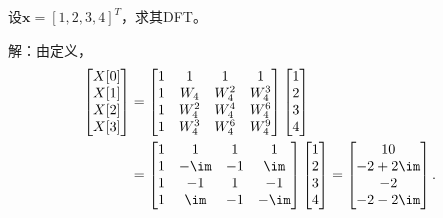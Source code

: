 \begin{example}
    设$\mathbf{x}=[1,2,3,4]^T$，求其DFT。

    解：由定义，
    \begin{align}
        \begin{bmatrix}
            X[0] \\
            X[1] \\
            X[2] \\
            X[3]
        \end{bmatrix}&=\begin{bmatrix}
            1 & 1     & 1     & 1     \\
            1 & W_4   & W_4^2 & W_4^3 \\
            1 & W_4^2 & W_4^4 & W_4^6 \\
            1 & W_4^3 & W_4^6 & W_4^9
        \end{bmatrix}\begin{bmatrix}
            1 \\
            2 \\
            3 \\
            4
        \end{bmatrix} \nonumber \\
        &=\begin{bmatrix}
            1 & 1    & 1  & 1    \\
            1 & -\im & -1 & \im  \\
            1 & -1   & 1  & -1   \\
            1 & \im  & -1 & -\im
        \end{bmatrix}\begin{bmatrix}
            1 \\
            2 \\
            3 \\
            4
        \end{bmatrix}=\begin{bmatrix}
            10      \\
            -2+2\im \\
            -2      \\
            -2-2\im
        \end{bmatrix}.
    \end{align}
\end{example}

